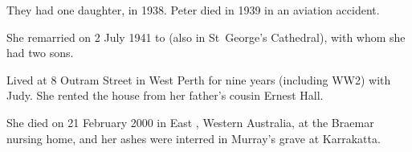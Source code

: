 They had one daughter, in 1938.\cite{JHBirthNotice}
Peter died in 1939 in an aviation accident.

She remarried on 2 July 1941\cite{MurrayMargMarriageNotice} to 
(also in St~George's Cathedral\cite{MurrayMargMarriageNotice}), with whom she had two sons.

Lived at 8 Outram Street in West Perth for nine years (including WW2) with Judy.\cite{OutramStPhoto}
She rented the house from her father's cousin Ernest Hall.

She died on 21 February 2000 in East , Western Australia, at the Braemar nursing home,
and her ashes were interred in Murray's grave at Karrakatta.
